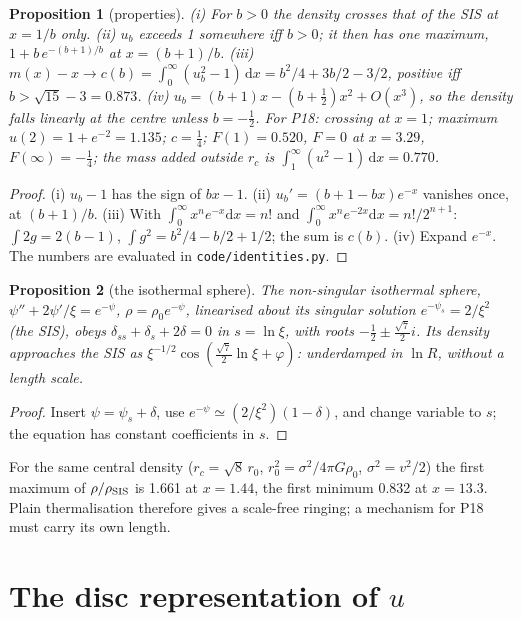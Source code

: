 \documentclass[11pt,a4paper]{article}
\newtheorem{proposition}{Proposition}
\theoremstyle{definition}
\theoremstyle{remark}
\newcommand{\rc}{r_c}
\newcommand{\dd}{\mathrm{d}}
\begin{document}
\begin{proposition}[properties]\label{prop:props}
(i) For $b>0$ the density crosses that of the SIS at $x=1/b$ only. (ii) $u_b$ exceeds 1
somewhere iff $b>0$; it then has one maximum, $1+b\,e^{-(b+1)/b}$ at $x=(b+1)/b$. (iii)
$m(x)-x\to c(b)=\int_0^\infty(u_b^2-1)\,\dd x=b^2/4+3b/2-3/2$, positive iff
$b>\sqrt{15}-3=0.873$. (iv) $u_b=(b+1)x-(b+\tfrac12)x^2+O(x^3)$, so the density falls linearly
at the centre unless $b=-\tfrac12$. For P18: crossing at $x=1$; maximum $u(2)=1+e^{-2}=1.135$;
$c=\tfrac14$; $F(1)=0.520$, $F=0$ at $x=3.29$, $F(\infty)=-\tfrac14$; the mass added outside
$\rc$ is $\int_1^\infty(u^2-1)\,\dd x=0.770$.
\end{proposition}
\begin{proof}
(i) $u_b-1$ has the sign of $bx-1$. (ii) $u_b'=(b+1-bx)e^{-x}$ vanishes once, at
$(b+1)/b$. (iii) With $\int_0^\infty x^ne^{-x}\dd x=n!$ and
$\int_0^\infty x^ne^{-2x}\dd x=n!/2^{n+1}$: $\int2g=2(b-1)$,
$\int g^2=b^2/4-b/2+1/2$; the sum is $c(b)$. (iv) Expand $e^{-x}$. The numbers are evaluated
in \texttt{code/identities.py}.
\end{proof}

\begin{proposition}[the isothermal sphere]\label{prop:emden}
The non-singular isothermal sphere, $\psi''+2\psi'/\xi=e^{-\psi}$, $\rho=\rho_0e^{-\psi}$,
linearised about its singular solution $e^{-\psi_s}=2/\xi^2$ (the SIS), obeys
$\delta_{ss}+\delta_s+2\delta=0$ in $s=\ln\xi$, with roots $-\tfrac12\pm\tfrac{\sqrt7}{2}i$.
Its density approaches the SIS as $\xi^{-1/2}\cos(\tfrac{\sqrt7}{2}\ln\xi+\varphi)$:
underdamped in $\ln R$, without a length scale.
\end{proposition}
\begin{proof}
Insert $\psi=\psi_s+\delta$, use $e^{-\psi}\simeq(2/\xi^2)(1-\delta)$, and change variable to
$s$; the equation has constant coefficients in $s$.
\end{proof}
For the same central density ($\rc=\sqrt8\,r_0$, $r_0^2=\sigma^2/4\pi G\rho_0$,
$\sigma^2=v^2/2$) the first maximum of $\rho/\rho_{\rm SIS}$ is 1.661 at $x=1.44$, the first
minimum 0.832 at $x=13.3$. Plain thermalisation therefore gives a scale-free ringing; a
mechanism for P18 must carry its own length.

\section{The disc representation of $u$}\label{sec:disc}
\end{document}
